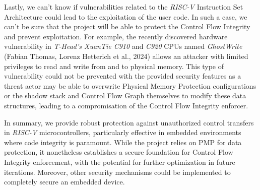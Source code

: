Lastly, we can't know if vulnerabilities related to the \textit{RISC-V} Instruction
Set Architecture could lead to the exploitation of the user code. In such a case,
we can't be sure that the project will be able to protect the Control Flow Integrity
and prevent exploitation. For example, the recently discovered hardware vulnerability
in \textit{T-Head's XuanTie C910} and \textit{C920} CPUs named \textit{GhostWrite}
(Fabian Thomas, Lorenz Hetterich et al., 2024)\cite{riscvuzz} allows an attacker
with limited privileges to read and write from and to physical memory. This type
of vulnerability could not be prevented with the provided security features as a
threat actor may be able to overwrite Physical Memory Protection configurations or
the shadow stack and Control Flow Graph themselves to modify these data structures,
leading to a compromisation of the Control Flow Integrity enforcer.

In summary, we provide robust protection against unauthorized control transfers in
\textit{RISC-V} microcontrollers, particularly effective in embedded environments
where code integrity is paramount. While the project relies on PMP for data
protection, it nonetheless establishes a secure foundation for Control Flow Integrity
enforcement, with the potential for further optimization in future iterations. Moreover,
other security mechanisms could be implemented to completely secure an embedded
device.